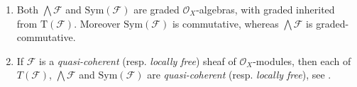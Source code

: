 \documentclass[../Main]{subfiles}
\begin{document}
\begin{rem}[]\leavevmode\vspace{-.2\baselineskip}
\label{rem:SheafSymExtProperties}
\begin{enumerate}
	\item Both $\bigwedge \mathcal{F}$ and $\mathrm{Sym}(\mathcal{F})$
		are graded $\mathcal{O}_{ X }$-algebras, with graded inherited
		from $\mathrm{T}(\mathcal{F})$.
		Moreover $\mathrm{Sym}(\mathcal{F})$ is commutative,
		whereas $\bigwedge \mathcal{F}$ is graded-commutative.


	\item \label{SheafqcSymExt}
		If $\mathcal{F}$ is a {\em quasi-coherent} (resp$.$ {\em locally free})
		sheaf of $\mathcal{O}_{ X }$-modules,
		then each of $T(\mathcal{F})$, $\bigwedge \mathcal{F}$ and
		$\mathrm{Sym}(\mathcal{F})$ are {\em quasi-coherent} (resp$.$ {\em locally free}),
		see \cite[\href{https://stacks.math.columbia.edu/tag/01CL}{Lemma 01CL}]{SP}.
\end{enumerate}
\end{rem}
\end{document}
